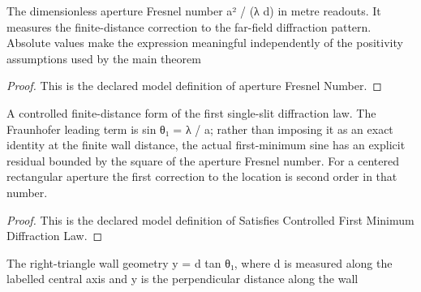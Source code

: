 \begin{definition}
  \label{def:physics:phyx-mini-0175:phyxminiproblems-problemphyxmini0175-aperturefresnelnumber}
  The dimensionless aperture Fresnel number a² / (λ d) in metre readouts. It measures the finite-distance correction to the far-field diffraction pattern. Absolute values make the expression meaningful independently of the positivity assumptions used by the main theorem
\end{definition}
\begin{proof}
  This is the declared model definition of aperture Fresnel Number.
\end{proof}
\begin{definition}
  \label{def:physics:phyx-mini-0175:phyxminiproblems-problemphyxmini0175-satisfiescontrolledfirstminimumdiffractionlaw}
  A controlled finite-distance form of the first single-slit diffraction law. The Fraunhofer leading term is sin θ₁ = λ / a; rather than imposing it as an exact identity at the finite wall distance, the actual first-minimum sine has an explicit residual bounded by the square of the aperture Fresnel number. For a centered rectangular aperture the first correction to the location is second order in that number.
\end{definition}
\begin{proof}
  This is the declared model definition of Satisfies Controlled First Minimum Diffraction Law.
\end{proof}
\begin{definition}
  \label{def:physics:phyx-mini-0175:phyxminiproblems-problemphyxmini0175-satisfieswallgeometry}
  The right-triangle wall geometry y = d tan θ₁, where d is measured along the labelled central axis and y is the perpendicular distance along the wall
\end{definition}
